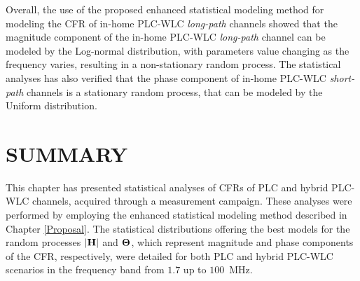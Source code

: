Overall, the use of the proposed enhanced statistical modeling method for modeling the \ac{CFR} of in-home \ac{PLC}-\ac{WLC} \textit{long-path} channels showed that the magnitude component of the in-home \ac{PLC}-\ac{WLC} \textit{long-path} channel can be modeled by the Log-normal distribution, with parameters value changing as the frequency varies, resulting in a non-stationary random process. The statistical analyses has also verified that the phase component of in-home \ac{PLC}-\ac{WLC} \textit{short-path} channels is a stationary random process, that can be modeled by the Uniform distribution.

\section{SUMMARY} \label{sec:NR5}

This chapter has presented statistical analyses of \acp{CFR} of \ac{PLC} and hybrid \ac{PLC}-\ac{WLC} channels, acquired through a measurement campaign. These analyses were performed by employing the enhanced statistical modeling method described in Chapter \ref{Proposal}. The statistical distributions offering the best models for the random processes ${|\bf{H}|}$ and ${\bf \Theta}$, which represent magnitude and phase components of the \ac{CFR}, respectively, were detailed for both \ac{PLC} and hybrid \ac{PLC}-\ac{WLC} scenarios in the frequency band from $1.7$ up to $100$~MHz.
